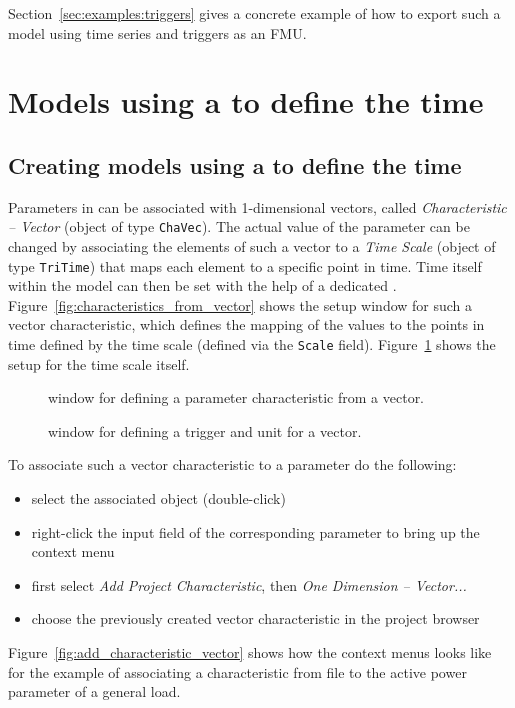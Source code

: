 Section~\ref{sec:examples:triggers} gives a concrete example of how to export such a model using time series and triggers as an FMU.


\section{Models using a \dplscript to define the time}

\subsection{Creating models using a \dplscript to define the time}
\label{sec:export:create_model_dplscript}

Parameters in \pf can be associated with 1-dimensional vectors, called \emph{Characteristic -- Vector} (\pf object of type \texttt{ChaVec}).
The actual value of the parameter can be changed by associating the elements of such a vector to a \emph{Time Scale} (\pf object of type \texttt{TriTime}) that maps each element to a specific point in time.
Time itself within the model can then be set with the help of a dedicated \dplscript.
Figure~\ref{fig:characteristics_from_vector} shows the setup window for such a vector characteristic, which defines the mapping of the values to the points in time defined by the time scale (defined via the \texttt{Scale} field).
Figure~\ref{fig:trigger_for_vector} shows the setup for the time scale itself.


\begin{figure}[h!]
\vspace*{1em}
\caption{\pf window for defining a parameter characteristic from a vector.}
\label{fig:characteristics_from_vector}
\vspace*{2em}
\caption{\pf window for defining a trigger and unit for a vector.}
\label{fig:trigger_for_vector}
\end{figure}

To associate such a vector characteristic to a parameter do the following:
\begin{itemize}
  \item select the associated object (double-click)
  \item right-click the input field of the corresponding parameter to bring up the context menu
  \item first select \emph{Add Project Characteristic}, then \emph{One Dimension -- Vector...}
  \item choose the previously created vector characteristic in the project browser
\end{itemize} 
Figure~\ref{fig:add_characteristic_vector} shows how the context menus looks like for the example of associating a characteristic from file to the active power parameter of a general load.

